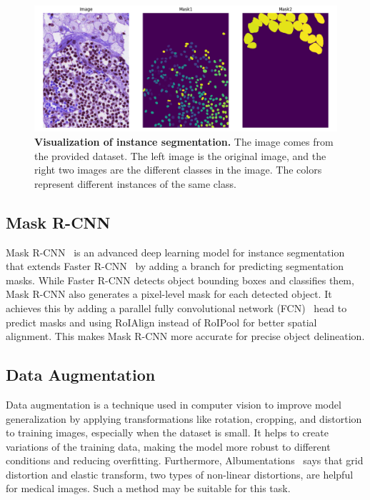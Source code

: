 \documentclass[10pt,twocolumn,letterpaper]{article}
\begin{document}
\begin{figure}[h]
  \centering
  \includegraphics[width=0.95\linewidth]{assets/instance_segmentation.png}
  \caption{\textbf{Visualization of instance segmentation.} The image comes 
    from the provided dataset. The left image is the original image, and the
    right two images are the different classes in the image. The colors
    represent different instances of the same class.}
  \label{fig:instance-segmentation}
\end{figure}

\subsection{Mask R-CNN}

Mask R-CNN~\cite{MaskRCNN} is an advanced deep learning model for instance
segmentation that extends Faster R-CNN~\cite{FasterRCNN}  by adding a branch
for predicting segmentation masks. While Faster R-CNN detects object bounding
boxes and classifies them, Mask R-CNN also generates a pixel-level mask for
each detected object. It achieves this by adding a parallel fully convolutional
network (FCN)~\cite{FCN} head to predict masks and using RoIAlign instead of
RoIPool for better spatial alignment. This makes Mask R-CNN more accurate for
precise object delineation.


\subsection{Data Augmentation}

Data augmentation is a technique used in computer vision to improve model
generalization by applying transformations like rotation, cropping, and
distortion to training images, especially when the dataset is small. It helps
to create variations of the training data, making the model more robust to
different conditions and reducing overfitting. Furthermore, Albumentations~\cite{info11020125}
says that grid distortion and elastic transform, two types of non-linear
distortions, are helpful for medical images.  Such a method may be suitable
for this task.
\end{document}
